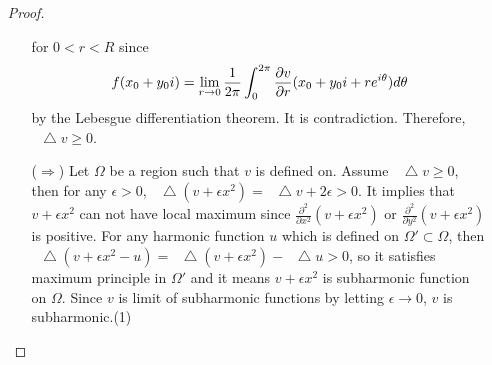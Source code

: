 \documentclass{article}
\newcommand*\Laplace{\mathop{}\!\mathbin\bigtriangleup}
\begin{document}
\begin{enumerate}
\begin{proof}
\begin{enumerate}
\begin{equation*}
\end{equation*}
for $0<r<R$ since
\begin{equation*}
f(x_0+y_0 i)=\lim\limits_{r\rightarrow 0}\frac{1}{2\pi}\int_0^{2\pi} {\pdv{v}{r}} (x_0+y_0 i+re^{i\theta})d\theta
\end{equation*}
by the Lebesgue differentiation theorem. It is contradiction. Therefore, $\Laplace v\geq 0$.
\item[($\Rightarrow$)] Let $\Omega$ be a region such that $v$ is defined on. Assume $\Laplace v\geq 0$, then for any $\epsilon>0$, $\Laplace (v+\epsilon x^2)=\Laplace v+2\epsilon>0$. It implies that $v+\epsilon x^2$ can not have local maximum since ${\frac{\partial^2}{\partial x^2}}(v+\epsilon x^2)$ or ${\frac{\partial^2}{\partial y^2}}(v+\epsilon x^2)$ is positive. For any harmonic function $u$ which is defined on $\Omega'\subset \Omega$, then $\Laplace(v+\epsilon x^2-u)=\Laplace(v+\epsilon x^2)-\Laplace u>0$, so it satisfies maximum principle in $\Omega'$ and it means $v+\epsilon x^2$ is subharmonic function on $\Omega$. Since $v$ is limit of subharmonic functions by letting $\epsilon\rightarrow 0$, $v$ is subharmonic.(1)


\end{enumerate}
\end{proof}
\end{enumerate}
\end{document}

